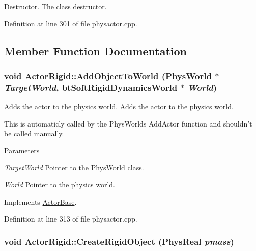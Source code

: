 Destructor. The class destructor. 

Definition at line 301 of file physactor.cpp.

\subsection{Member Function Documentation}
\hypertarget{classActorRigid_ac6d7e05944623329f0c2140c19e2c49e}{
\subsubsection[{AddObjectToWorld}]{\setlength{\rightskip}{0pt plus 5cm}void ActorRigid::AddObjectToWorld ({\bf PhysWorld} $\ast$ {\em TargetWorld}, \/  btSoftRigidDynamicsWorld $\ast$ {\em World})}}
\label{d5/d10/classActorRigid_ac6d7e05944623329f0c2140c19e2c49e}


Adds the actor to the physics world. Adds the actor to the physics world. \par
 This is automaticly called by the PhysWorlds AddActor function and shouldn't be called manually. 
\begin{DoxyParams}{Parameters}
\item[{\em TargetWorld}]Pointer to the \hyperlink{classPhysWorld}{PhysWorld} class. \item[{\em World}]Pointer to the physics world. \end{DoxyParams}


Implements \hyperlink{classActorBase_a1af82a2ed960fd114518fdf84d5ff146}{ActorBase}.

Definition at line 313 of file physactor.cpp.\hypertarget{classActorRigid_ac651eed187c3cb912bc7f294f0b42ad1}{
\subsubsection[{CreateRigidObject}]{\setlength{\rightskip}{0pt plus 5cm}void ActorRigid::CreateRigidObject (PhysReal {\em pmass})}}
\label{d5/d10/classActorRigid_ac651eed187c3cb912bc7f294f0b42ad1}


